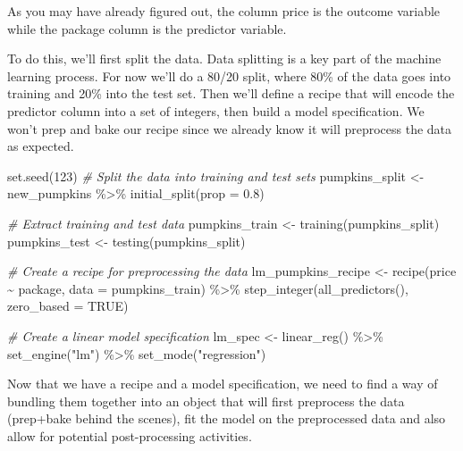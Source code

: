 \documentclass[
]{article}
\newenvironment{Shaded}{\begin{snugshade}}{\end{snugshade}}
\newcommand{\AttributeTok}[1]{\textcolor[rgb]{0.77,0.63,0.00}{#1}}
\newcommand{\CommentTok}[1]{\textcolor[rgb]{0.56,0.35,0.01}{\textit{#1}}}
\newcommand{\ConstantTok}[1]{\textcolor[rgb]{0.00,0.00,0.00}{#1}}
\newcommand{\DecValTok}[1]{\textcolor[rgb]{0.00,0.00,0.81}{#1}}
\newcommand{\FloatTok}[1]{\textcolor[rgb]{0.00,0.00,0.81}{#1}}
\newcommand{\FunctionTok}[1]{\textcolor[rgb]{0.00,0.00,0.00}{#1}}
\newcommand{\NormalTok}[1]{#1}
\newcommand{\OtherTok}[1]{\textcolor[rgb]{0.56,0.35,0.01}{#1}}
\newcommand{\SpecialCharTok}[1]{\textcolor[rgb]{0.00,0.00,0.00}{#1}}
\newcommand{\StringTok}[1]{\textcolor[rgb]{0.31,0.60,0.02}{#1}}
\begin{document}
As you may have already figured out, the column price is the outcome
variable while the package column is the predictor variable.

To do this, we'll first split the data. Data splitting is a key part of
the machine learning process. For now we'll do a 80/20 split, where 80\%
of the data goes into training and 20\% into the test set. Then we'll
define a recipe that will encode the predictor column into a set of
integers, then build a model specification. We won't prep and bake our
recipe since we already know it will preprocess the data as expected.

\begin{Shaded}
\begin{Highlighting}[]
\FunctionTok{set.seed}\NormalTok{(}\DecValTok{123}\NormalTok{)}
\CommentTok{\# Split the data into training and test sets}
\NormalTok{pumpkins\_split }\OtherTok{\textless{}{-}}\NormalTok{ new\_pumpkins }\SpecialCharTok{\%\textgreater{}\%} 
  \FunctionTok{initial\_split}\NormalTok{(}\AttributeTok{prop =} \FloatTok{0.8}\NormalTok{)}


\CommentTok{\# Extract training and test data}
\NormalTok{pumpkins\_train }\OtherTok{\textless{}{-}} \FunctionTok{training}\NormalTok{(pumpkins\_split)}
\NormalTok{pumpkins\_test }\OtherTok{\textless{}{-}} \FunctionTok{testing}\NormalTok{(pumpkins\_split)}


\CommentTok{\# Create a recipe for preprocessing the data}
\NormalTok{lm\_pumpkins\_recipe }\OtherTok{\textless{}{-}} \FunctionTok{recipe}\NormalTok{(price }\SpecialCharTok{\textasciitilde{}}\NormalTok{ package, }\AttributeTok{data =}\NormalTok{ pumpkins\_train) }\SpecialCharTok{\%\textgreater{}\%} 
  \FunctionTok{step\_integer}\NormalTok{(}\FunctionTok{all\_predictors}\NormalTok{(), }\AttributeTok{zero\_based =} \ConstantTok{TRUE}\NormalTok{)}


\CommentTok{\# Create a linear model specification}
\NormalTok{lm\_spec }\OtherTok{\textless{}{-}} \FunctionTok{linear\_reg}\NormalTok{() }\SpecialCharTok{\%\textgreater{}\%} 
  \FunctionTok{set\_engine}\NormalTok{(}\StringTok{"lm"}\NormalTok{) }\SpecialCharTok{\%\textgreater{}\%} 
  \FunctionTok{set\_mode}\NormalTok{(}\StringTok{"regression"}\NormalTok{)}
\end{Highlighting}
\end{Shaded}

Now that we have a recipe and a model specification, we need to find a
way of bundling them together into an object that will first preprocess
the data (prep+bake behind the scenes), fit the model on the
preprocessed data and also allow for potential post-processing
activities.
\end{document}
